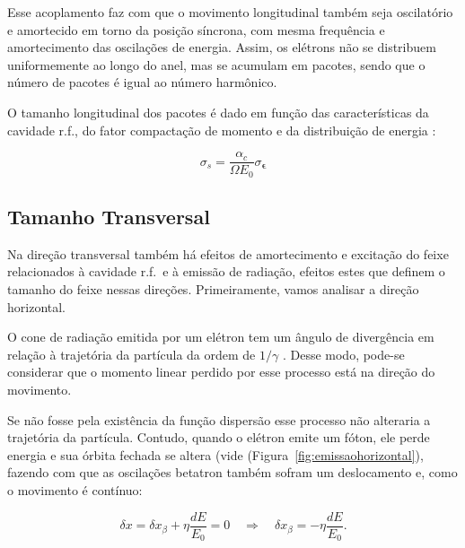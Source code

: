 Esse acoplamento faz com que o movimento longitudinal também seja oscilatório e amortecido em torno da posição síncrona, com mesma frequência e amortecimento das oscilações de energia. Assim, os elétrons não se distribuem uniformemente ao longo do anel, mas se acumulam em pacotes, sendo que o número de pacotes é igual ao número harmônico.

O tamanho longitudinal dos pacotes é dado em função das características da cavidade r.f., do fator compactação de momento e da distribuição de energia \cite{Sands}:

\begin{equation}
 \sigma_s= \frac{\alpha_c}{\Omega E_0}\sigma_{\boldsymbol{\epsilon}}
\end{equation}

\subsection{Tamanho Transversal}

Na direção transversal também há efeitos de amortecimento e excitação do feixe relacionados à cavidade r.f.~e à emissão de radiação, efeitos estes que definem o tamanho do feixe nessas direções. Primeiramente, vamos analisar a direção horizontal.


O cone de radiação emitida por um elétron tem um ângulo de divergência em relação à trajetória da partícula da ordem de $1/\gamma$ \cite{Lee}. Desse modo, pode-se considerar que o momento linear perdido por esse processo está na direção do movimento.

Se não fosse pela existência da função dispersão esse processo não alteraria a trajetória da partícula. Contudo, quando o elétron emite um fóton, ele perde energia e sua órbita fechada se altera (vide \mbox{(Figura \ref{fig:emissaohorizontal})}, fazendo com que as oscilações betatron também sofram um deslocamento e, como o movimento é contínuo:

\begin{equation}
 \delta x = \delta x_\beta + \eta \frac{d E}{E_0} = 0 \quad
\Rightarrow \quad \delta x_\beta =- \eta \frac{d E}{E_0}.
\end{equation}

